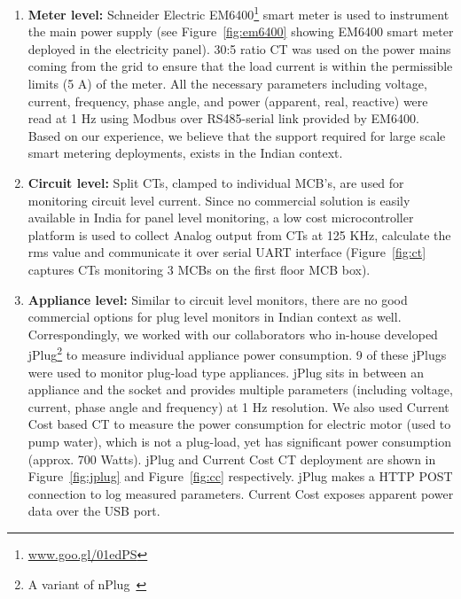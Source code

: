 \documentclass[10pt]{sensys-proc}
\newcommand{\figref}[1]{Figure~\ref{#1}}
\newcommand{\denselistbib}{
  \itemsep -.6pt\topsep-4pt\partopsep-10pt
}
\begin{document}
\begin{enumerate}\denselistbib
\item \textbf{Meter level:} Schneider Electric EM6400\footnote{\url{www.goo.gl/01edPS}} smart meter is used to instrument the main power supply (see \figref{fig:em6400} showing EM6400 smart meter deployed in the electricity panel). %
30:5 ratio CT was used on the power mains coming from the grid to ensure that the load current is within the permissible limits (5 A) of the meter. All the necessary parameters including voltage, current, frequency, phase angle, and power (apparent, real, reactive) were read at 1 Hz using Modbus over RS485-serial link provided by EM6400. Based on our experience, we believe that the support required for large scale smart metering deployments, exists in the Indian context. 

\item \textbf{Circuit level:} Split CTs, clamped to individual MCB's, are used for monitoring circuit level current. Since no commercial solution is easily available in India for panel level monitoring, a low cost microcontroller platform is used to collect Analog output from CTs at 125 KHz, calculate the rms value and communicate it over serial UART interface (\figref{fig:ct} captures CTs monitoring 3 MCBs on the first floor MCB box).

\item \textbf{Appliance level:} Similar to circuit level monitors, there are no good commercial options for plug level monitors in Indian context as well. Correspondingly, we worked with our collaborators who in-house developed jPlug\footnote{A variant of nPlug~\cite{nplug}} to measure individual appliance power consumption. 9 of these jPlugs were used to monitor plug-load type appliances. jPlug sits in between an appliance and the socket and provides multiple parameters (including voltage, current, phase angle and frequency) at 1 Hz resolution. We also used Current Cost based CT to measure the power consumption for electric motor (used to pump water), which is not a plug-load, yet has significant power consumption (approx. 700 Watts). jPlug and Current Cost CT deployment are shown in \figref{fig:jplug} and \figref{fig:cc} respectively. jPlug makes a HTTP POST connection to log measured parameters. Current Cost exposes apparent power data over the USB port. 
\end{enumerate}
\end{document}
